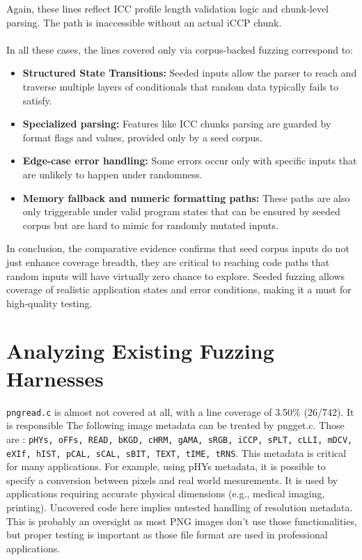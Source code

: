 \documentclass[11pt]{article}
\begin{document}
    Again, these lines reflect ICC profile length validation logic and chunk-level parsing. The path is inaccessible without an actual iCCP chunk.
    \\ \\
    In all these cases, the lines covered only via corpus-backed fuzzing correspond to:
    \begin{itemize}
        \item \textbf{Structured State Transitions:} Seeded inputs allow the parser to reach and traverse multiple layers of conditionals that random data typically fails to satisfy.
        \item \textbf{Specialized parsing:} Features like ICC chunks parsing are guarded by format flags and values, provided only by a seed corpus.
        \item \textbf{Edge-case error handling:} Some errors occur only with specific inputs that are unlikely to happen under randomness.
        \item \textbf{Memory fallback and numeric formatting paths:} These paths are also only triggerable under valid program states that can be ensured by seeded corpus but are hard to mimic for randomly mutated inputs.
    \end{itemize}


    In conclusion, the comparative evidence confirms that seed corpus inputs do not just enhance coverage breadth, they are critical to reaching code paths that random inputs will have virtually zero chance to explore. Seeded fuzzing allows coverage of realistic application states and error conditions, making it a must for high-quality testing.


    \section{Analyzing Existing Fuzzing Harnesses}

    \texttt{pngread.c} is almost not covered at all, with a line coverage of  3.50\% (26/742). It is responsible The following image metadata can be treated by pngget.c. Those are : \texttt{pHYs, oFFs, READ, bKGD, cHRM, gAMA, sRGB, iCCP, sPLT, cLLI,  mDCV, eXIf, hIST, pCAL, sCAL, sBIT, TEXT, tIME, tRNS}.
    This metadata is critical for many applications. For example, using pHYs metadata, it is possible to specify a conversion between pixels and real world mesurements. It is used by applications requiring accurate physical dimensions (e.g., medical imaging, printing). Uncovered code here implies untested handling of resolution metadata. This is probably an oversight as most PNG images don't use those functionalities, but proper testing is important as those file format are used in professional applications.
\end{document}
